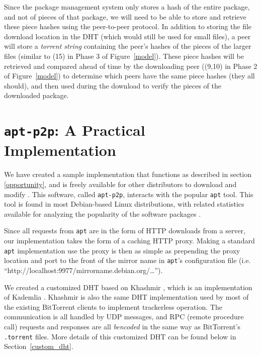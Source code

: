 \documentclass[conference]{IEEEtran}
\begin{document}
Since the package management system only stores a hash of the entire
package, and not of pieces of that package, we will need to be able
to store and retrieve these piece hashes using the peer-to-peer protocol. In
addition to storing the file download location in the DHT (which
would still be used for small files), a peer will store a
\emph{torrent string} containing the peer's hashes of the pieces of
the larger files (similar to (15) in Phase 3 of Figure~\ref{model}).
These piece hashes will be retrieved and compared ahead of time by
the downloading peer ((9,10) in Phase 2 of Figure~\ref{model})
to determine which peers have the same piece hashes (they all
should), and then used during the download to verify the pieces of
the downloaded package.


\section{\texttt{apt-p2p}: A Practical Implementation}
\label{implementation}

We have created a sample implementation that functions as described
in section \ref{opportunity}, and is freely available for other
distributors to download and modify \cite{apt-p2p}. This software,
called \texttt{apt-p2p}, interacts with the popular \texttt{apt} tool. This tool 
is found in most Debian-based Linux distributions, with related statistics
available for analyzing the popularity of the software packages
\cite{popcon}.

Since all requests from \texttt{apt} are in the form of HTTP downloads from a
server, our implementation takes the form of a caching HTTP proxy.
Making a standard \texttt{apt} implementation use the proxy is then
as simple as prepending the proxy location and port to the front of
the mirror name in \texttt{apt}'s configuration file (i.e.
``http://localhost:9977/mirrorname.debian.org/\ldots'').

We created a customized DHT based on Khashmir \cite{khashmir}, which
is an implementation of Kademlia \cite{kademlia}. Khashmir is also the same DHT
implementation used by most of the existing BitTorrent clients to
implement trackerless operation. The communication is all handled by
UDP messages, and RPC (remote procedure call) requests and responses
are all \emph{bencoded} in the same way as BitTorrent's
\texttt{.torrent} files.
More details of this customized DHT can be found below in
Section~\ref{custom_dht}.
\end{document}
